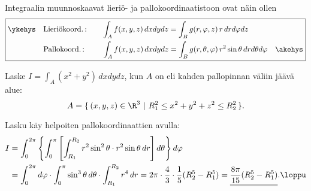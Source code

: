 Integraalin muunnoskaavat lieriö- ja pallokoordinaatistoon ovat näin ollen                                     
\[
\boxed{\begin{aligned}
\ykehys\quad &\text{Lieriökoord.\,:} \qquad 
              \int_A f(x,y,z)\,dxdydz = \int_B g(r,\varphi,z)\,r\,drd\varphi dz \\
             &\text{Pallokoord.\,:} \qquad\    
              \int_A f(x,y,z)\,dxdydz 
                = \int_B g(r,\theta,\varphi)\,r^2\sin\theta\,drd\theta d\varphi \quad\akehys 
\end{aligned}}
\]
\begin{Exa} \label{integraali yli pallokuoren} Laske $I=\int_A(x^2+y^2)\,dxdydz$, kun $A$ on
\index{pallokuori}%
 eli kahden pallopinnan väliin jäävä alue:
\[
A=\{\,(x,y,z)\in\R^3\ |\ R_1^2 \le x^2+y^2+z^2 \le R_2^2\,\}.
\]
\end{Exa} 
\ratk Lasku käy helpoiten pallokoordinaattien avulla:
\begin{align*}
I &= \int_0^{2\pi}\left\{\int_0^\pi\left[\int_{R_1}^{R_2}
         r^2\sin^2\theta\cdot r^2\sin\theta\,dr\right]d\theta\right\}d\varphi \\
  &= \int_0^{2\pi}d\varphi\cdot\int_0^\pi\sin^3\theta\,d\theta\cdot\int_{R_1}^{R_2}r^4\,dr
   = 2\pi\cdot\frac{4}{3}\cdot\frac{1}{5}(R_2^5-R_1^5)
   = \underline{\underline{\frac{8\pi}{15}(R_2^5-R_1^5)}}. \loppu
\end{align*}

